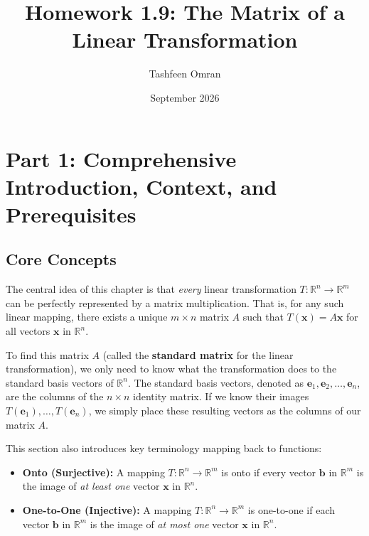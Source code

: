 \documentclass[11pt]{article}
\title{Homework 1.9: The Matrix of a Linear Transformation}
\author{Tashfeen Omran}
\date{September 2026}
\begin{document}
\maketitle
\tableofcontents
\newpage

\section{Part 1: Comprehensive Introduction, Context, and Prerequisites}

\subsection{Core Concepts}
The central idea of this chapter is that \textit{every} linear transformation $T: \mathbb{R}^n \to \mathbb{R}^m$ can be perfectly represented by a matrix multiplication. That is, for any such linear mapping, there exists a unique $m \times n$ matrix $A$ such that $T(\mathbf{x}) = A\mathbf{x}$ for all vectors $\mathbf{x}$ in $\mathbb{R}^n$. 

To find this matrix $A$ (called the \textbf{standard matrix} for the linear transformation), we only need to know what the transformation does to the standard basis vectors of $\mathbb{R}^n$. The standard basis vectors, denoted as $\mathbf{e}_1, \mathbf{e}_2, \dots, \mathbf{e}_n$, are the columns of the $n \times n$ identity matrix. If we know their images $T(\mathbf{e}_1), \dots, T(\mathbf{e}_n)$, we simply place these resulting vectors as the columns of our matrix $A$.

This section also introduces key terminology mapping back to functions:
\begin{itemize}
    \item \textbf{Onto (Surjective):} A mapping $T: \mathbb{R}^n \to \mathbb{R}^m$ is onto if every vector $\mathbf{b}$ in $\mathbb{R}^m$ is the image of \textit{at least one} vector $\mathbf{x}$ in $\mathbb{R}^n$.
    \item \textbf{One-to-One (Injective):} A mapping $T: \mathbb{R}^n \to \mathbb{R}^m$ is one-to-one if each vector $\mathbf{b}$ in $\mathbb{R}^m$ is the image of \textit{at most one} vector $\mathbf{x}$ in $\mathbb{R}^n$.
\end{itemize}
\end{document}
